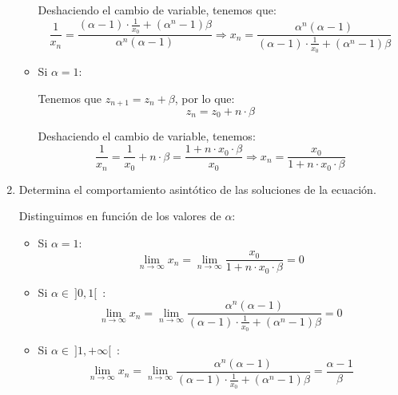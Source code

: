 \begin{ejercicio}
\begin{enumerate}
\begin{itemize}
            Deshaciendo el cambio de variable, tenemos que:
            \begin{equation*}
                \frac{1}{x_n} = \frac{(\alpha-1)\cdot \frac{1}{x_0} + (\alpha^n-1)\beta}{\alpha^n(\alpha-1)}
                \Longrightarrow
                x_n = \frac{\alpha^n(\alpha-1)}{(\alpha-1)\cdot \frac{1}{x_0} + (\alpha^n-1)\beta}
            \end{equation*}

            \item Si $\alpha=1$:

            Tenemos que $z_{n+1}=z_n+\beta$, por lo que:
            \begin{equation*}
                z_n = z_0 + n\cdot \beta
            \end{equation*}

            Deshaciendo el cambio de variable, tenemos:
            \begin{equation*}
                \frac{1}{x_n} = \frac{1}{x_0}+n\cdot \beta =
                \frac{1+n\cdot x_0\cdot \beta}{x_0}
                \Longrightarrow
                x_n = \frac{x_0}{1+n\cdot x_0\cdot \beta}
            \end{equation*}
        \end{itemize}
        \item Determina el comportamiento asintótico de las soluciones de la ecuación.

        Distinguimos en función de los valores de $\alpha$:
        \begin{itemize}
            \item Si $\alpha=1$:
            \begin{equation*}
                \lim_{n\to \infty}x_n
                = \lim_{n\to \infty}\frac{x_0}{1+n\cdot x_0\cdot \beta}=0
            \end{equation*}

            \item Si $\alpha\in ~]0,1[$~:
            \begin{equation*}
                \lim_{n\to \infty}x_n
                = \lim_{n\to \infty}\frac{\alpha^n(\alpha-1)}{(\alpha-1)\cdot \frac{1}{x_0} + (\alpha^n-1)\beta}=0
            \end{equation*}
            \item Si $\alpha\in ~]1,+\infty[$~:
            \begin{equation*}
                \lim_{n\to \infty}x_n
                = \lim_{n\to \infty}\frac{\alpha^n(\alpha-1)}{(\alpha-1)\cdot \frac{1}{x_0} + (\alpha^n-1)\beta}=\frac{\alpha-1}{\beta}
            \end{equation*}
        \end{itemize}
    \end{enumerate}
\end{ejercicio}


